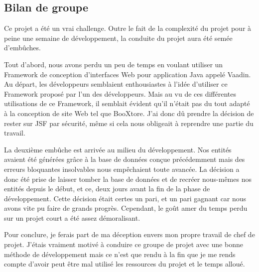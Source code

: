 \subsection{Bilan de groupe}
Ce projet a été un vrai challenge. Outre le fait de la complexité du projet pour à peine une semaine de développement, la conduite du projet aura été semée d’embûches.

Tout d’abord, nous avons perdu un peu de temps en voulant utiliser un Framework de conception d’interfaces Web pour application Java appelé Vaadin. Au départ, les développeurs semblaient enthousiastes à l’idée d’utiliser ce Framework proposé par l’un des développeurs. Mais au vu de ces différentes utilisations de ce Framework, il semblait évident qu’il n’était pas du tout adapté à la conception de site Web tel que BooXtore. J’ai donc dû prendre la décision de rester sur JSF par sécurité, même si cela nous obligeait à reprendre une partie du travail.

La deuxième embûche est arrivée au milieu du développement. Nos entités avaient été générées grâce à la base de données conçue précédemment mais des erreurs bloquantes insolvables nous empêchaient toute avancée. La décision a donc été prise de laisser tomber la base de données et de recréer nous-mêmes nos entités depuis le début, et ce, deux jours avant la fin de la phase de développement. Cette décision était certes un pari, et un pari gagnant car nous avons vite pu faire de grands progrès. Cependant, le goût amer du temps perdu sur un projet court a été assez démoralisant.

Pour conclure, je ferais part de ma déception envers mon propre travail de chef de projet. J’étais vraiment motivé à conduire ce groupe de projet avec une bonne méthode de développement mais ce n’est que rendu à la fin que je me rends compte d’avoir peut être mal utilisé les ressources du projet et le temps alloué.

